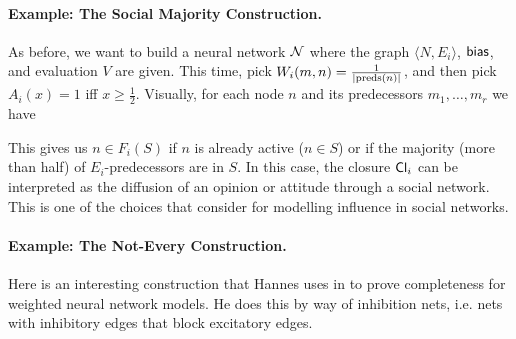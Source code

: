 \documentclass[letterpaper]{article}
\begin{document}
\paragraph*{Example: The Social Majority Construction.}
    As before, we want to build a neural network $\mathcal{N}$ where the graph $\langle N, E_i \rangle$, $\mathsf{bias}$, and evaluation $V$ are given.  This time, pick $W_i(m, n) = \frac{1}{|\mathrm{preds}(n)|}$, and then pick $A_i(x) = 1$ iff $x \geq \frac{1}{2}$. Visually, for each node $n$ and its predecessors $m_1, \ldots, m_r$ we have
    \begin{center}
    \end{center}
    This gives us $n \in F_i(S)$ if $n$ is already active ($n \in S$) or if the majority (more than half) of $E_i$-predecessors are in $S$.  In this case, the closure $\mathsf{Cl}_i$ can be interpreted as the diffusion of an opinion or attitude through a social network.  This is one of the choices that \cite{baltag2019socialnetworks} consider for modelling influence in social networks.

\paragraph*{Example: The Not-Every Construction.}
    Here is an interesting construction that Hannes uses in \cite{leitgeb2001nonmonotonic} to prove completeness for weighted neural network models.  He does this by way of inhibition nets, i.e. nets with inhibitory edges that block excitatory edges.
    
\end{document}
